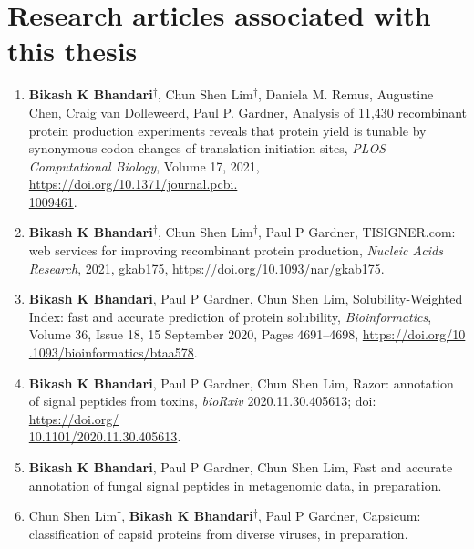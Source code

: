 \section*{Research articles associated with this thesis}
\begin{enumerate}
	
	
	\item \textbf{Bikash K Bhandari}\textsuperscript{$\dagger$}, Chun Shen Lim\textsuperscript{$\dagger$}, Daniela M. Remus, Augustine Chen, Craig van Dolleweerd, Paul P. Gardner, Analysis of 11,430 recombinant protein production experiments reveals that protein yield is tunable by synonymous codon changes of translation initiation sites, \textit{PLOS Computational Biology}, Volume 17, 2021, \href{https://doi.org/10.1371/journal.pcbi.1009461}{https://doi.org/10.1371/journal.pcbi.\\1009461}.

	\item \textbf{Bikash K Bhandari}\textsuperscript{$\dagger$}, Chun Shen Lim\textsuperscript{$\dagger$}, Paul P Gardner, TISIGNER.com: web services for improving recombinant protein production, \textit{Nucleic Acids Research}, 2021, gkab175, \href{https://doi.org/10.1093/nar/gkab175}{https://doi.org/10.1093/nar/gkab175}.
	
	\item \textbf{Bikash K Bhandari}, Paul P Gardner, Chun Shen Lim, Solubility-Weighted Index: fast and accurate prediction of protein solubility, \textit{Bioinformatics}, Volume 36, Issue 18, 15 September 2020, Pages 4691–4698, \href{https://doi.org/10.1093/bioinformatics/btaa578}{https://doi.org/10\\.1093/bioinformatics/btaa578}.
	
	
	
	\item \textbf{Bikash K Bhandari}, Paul P Gardner, Chun Shen Lim, Razor: annotation of signal peptides from toxins, \textit{bioRxiv} 2020.11.30.405613; doi: \href{https://doi.org/10.1101/2020.11.30.405613}{https://doi.org/\\10.1101/2020.11.30.405613}.
	
	\item \textbf{Bikash K Bhandari}, Paul P Gardner, Chun Shen Lim, Fast and accurate annotation of fungal signal peptides in metagenomic data, in preparation.


	\item Chun Shen Lim\textsuperscript{$\dagger$}, \textbf{Bikash K Bhandari}\textsuperscript{$\dagger$}, Paul P Gardner, Capsicum: classification of capsid proteins from diverse viruses, in preparation.

	
\end{enumerate}

